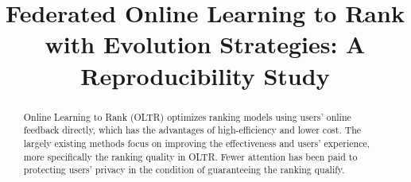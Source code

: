 \documentclass[runningheads]{llncs}
\begin{document}

\title{Federated Online Learning to Rank with Evolution Strategies: A Reproducibility Study}


%



\maketitle

\begin{abstract}
Online Learning to Rank (OLTR) optimizes ranking models using users' online feedback directly, which has the advantages of high-efficiency and lower cost. The largely existing methods focus on improving the effectiveness and users' experience, more specifically the ranking quality in OLTR. Fewer attention has been paid to protecting users' privacy in the condition of guaranteeing the ranking qualify. 
\end{abstract}

%

%
%
\end{document}
